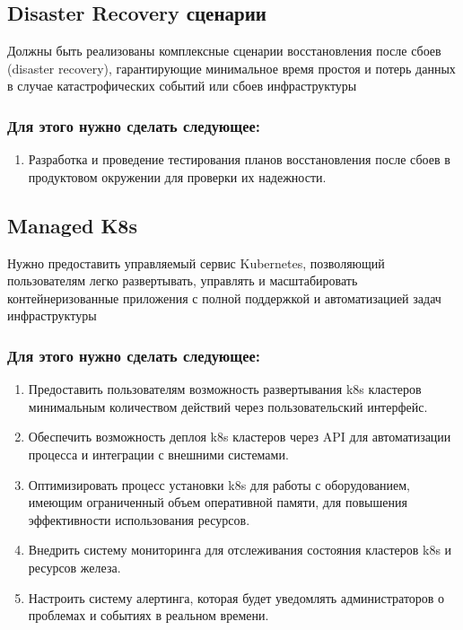 \documentclass[14pt, a4paper]{extarticle}
\begin{document}
\subsection{Disaster Recovery сценарии}

Должны быть реализованы комплексные сценарии восстановления после сбоев (disaster recovery), гарантирующие минимальное время простоя и потерь данных в случае катастрофических событий или сбоев инфраструктуры

\subsubsection*{Для этого нужно сделать следующее:}

\begin{enumerate}
\item Разработка и проведение тестирования планов восстановления после сбоев в продуктовом окружении для проверки их надежности.
\end{enumerate}

\subsection{Managed K8s}

Нужно предоставить управляемый сервис Kubernetes, позволяющий пользователям легко развертывать, управлять и масштабировать контейнеризованные приложения с полной поддержкой и автоматизацией задач инфраструктуры

\subsubsection*{Для этого нужно сделать следующее:}

\begin{enumerate}
\item Предоставить пользователям возможность развертывания k8s кластеров минимальным количеством действий через пользовательский интерфейс.
\item Обеспечить возможность деплоя k8s кластеров через API для автоматизации процесса и интеграции с внешними системами.
\item Оптимизировать процесс установки k8s для работы с оборудованием, имеющим ограниченный объем оперативной памяти, для повышения эффективности использования ресурсов.
\item Внедрить систему мониторинга для отслеживания состояния кластеров k8s и ресурсов железа.
\item Настроить систему алертинга, которая будет уведомлять администраторов о проблемах и событиях в реальном времени.
\end{enumerate}
\end{document}
